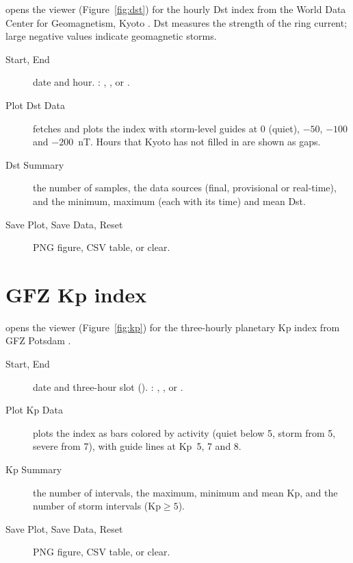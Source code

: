  opens the  viewer
(Figure~\ref{fig:dst}) for the hourly Dst index from the World Data Center for
Geomagnetism, Kyoto \parencite{nose2015}. Dst measures the strength of the ring current;
large negative values indicate geomagnetic storms.


\begin{description}
  \item[Start, End] date and hour. : , ,
     or .
  \item[Plot Dst Data] fetches and plots the index with storm-level guides at 0 (quiet),
    \(-50\), \(-100\) and \(-200\)~nT. Hours that Kyoto has not filled in are shown as gaps.
  \item[Dst Summary] the number of samples, the data sources (final, provisional or
    real-time), and the minimum, maximum (each with its time) and mean Dst.
  \item[Save Plot, Save Data, Reset] PNG figure, CSV table, or clear.
\end{description}

\section{GFZ Kp index}
\label{sec:kp}

 opens the  viewer
(Figure~\ref{fig:kp}) for the three-hourly planetary Kp index from GFZ Potsdam
\parencite{matzka2021}.


\begin{description}
  \item[Start, End] date and three-hour slot (). :
    , ,  or .
  \item[Plot Kp Data] plots the index as bars colored by activity (quiet below 5, storm from
    5, severe from 7), with guide lines at Kp~5, 7 and 8.
  \item[Kp Summary] the number of intervals, the maximum, minimum and mean Kp, and the
    number of storm intervals (\(\mathrm{Kp}\geq5\)).
  \item[Save Plot, Save Data, Reset] PNG figure, CSV table, or clear.
\end{description}

